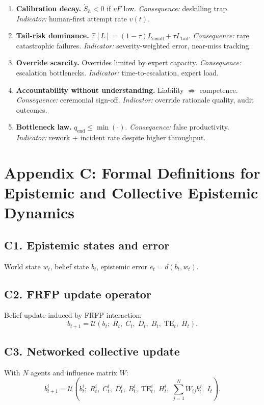 \begin{enumerate}[label=\textbf{L\arabic*.}, leftmargin=*]
  \item \textbf{Calibration decay.} $\dot S_h<0$ if $vF$ low. \emph{Consequence:} deskilling trap. \emph{Indicator:} human-first attempt rate $v(t)$.
  \item \textbf{Tail-risk dominance.} $\mathbb{E}[L]=(1-\tau)L_{\text{small}}+\tau L_{\text{tail}}$. \emph{Consequence:} rare catastrophic failures. \emph{Indicator:} severity-weighted error, near-miss tracking.
  \item \textbf{Override scarcity.} Overrides limited by expert capacity. \emph{Consequence:} escalation bottlenecks. \emph{Indicator:} time-to-escalation, expert load.
  \item \textbf{Accountability without understanding.} Liability $\not\Rightarrow$ competence. \emph{Consequence:} ceremonial sign-off. \emph{Indicator:} override rationale quality, audit outcomes.
  \item \textbf{Bottleneck law.} $q_{\text{end}}\le \min(\cdot)$. \emph{Consequence:} false productivity. \emph{Indicator:} rework + incident rate despite higher throughput.
\end{enumerate}
\newpage
\section*{Appendix C: Formal Definitions for Epistemic and Collective Epistemic Dynamics}

\subsection*{C1. Epistemic states and error}
World state $w_t$, belief state $b_t$, epistemic error $e_t=d(b_t,w_t)$.

\subsection*{C2. FRFP update operator}
Belief update induced by FRFP interaction:
\[
b_{t+1}=\mathcal{U}\!\left(b_t;\; R_t,\; C_t,\; D_t,\; B_t,\; \text{TE}_t,\; H_t\right).
\]

\subsection*{C3. Networked collective update}
With $N$ agents and influence matrix $W$:
\[
b^i_{t+1}=
\mathcal{U}\!\left(
b^i_t;\; R^i_t,\; C^i_t,\; D^i_t,\; B^i_t,\; \text{TE}^i_t,\; H^i_t,\;
\sum_{j=1}^N W_{ij} b^j_t,\; I_t
\right).
\]

